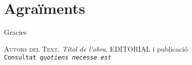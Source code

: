 \documentclass[a4paper,11pt, titlepage, twoside]{article}
\begin{document}
\section*{Agraïments}
 Gracies

 
 
 \begin{thebibliography}{99}\label{biblio}
 
  \textsc{Autors del Text}, {} 
 \textit{Títol de l'obra}, EDITORIAL i publicació\\ 
 \texttt{Consultat \emph{quotiens necesse est}}
 

 \end{thebibliography}
 
 
\end{document}
